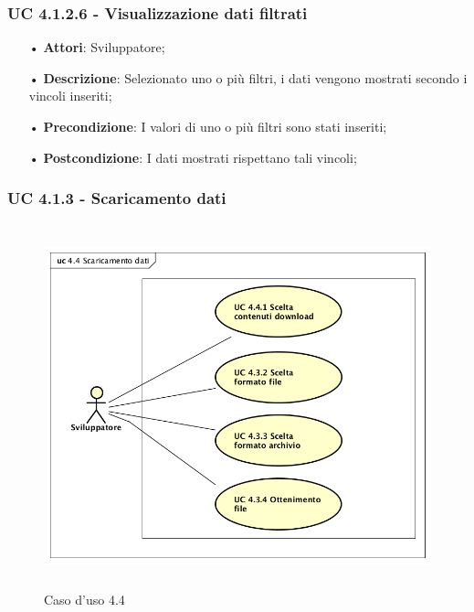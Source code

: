 \subsubsection{UC 4.1.2.6 - Visualizzazione dati filtrati}
\begin{itemize}
\item[•]\textbf{Attori}: Sviluppatore;
\item[•]\textbf{Descrizione}: Selezionato uno o più filtri, i dati vengono mostrati secondo i vincoli inseriti;
\item[•]\textbf{Precondizione}: I valori di uno o più filtri sono stati inseriti;
\item[•]\textbf{Postcondizione}: I dati mostrati rispettano tali vincoli;
\end{itemize}

\subsubsection{UC 4.1.3 - Scaricamento dati}
\begin{figure}[H]
\centering
\includegraphics[width=17cm, height=10.5cm]{img/UC440.png} 
\caption{Caso d'uso 4.4}\label{fig:440}
\end{figure}
